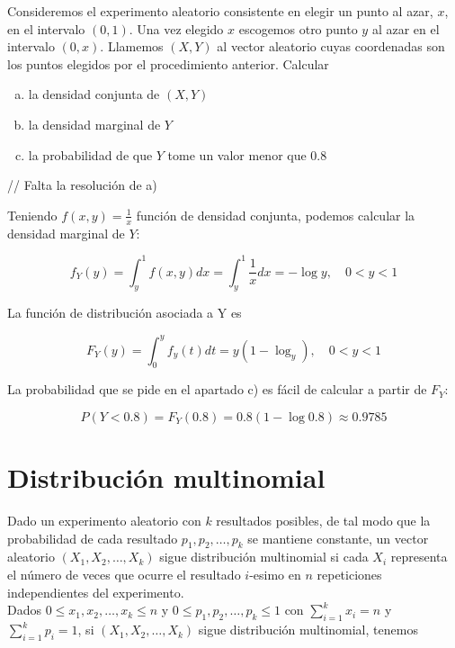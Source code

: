 \documentclass{article}
\begin{document}
\begin{theorem}
    
    Consideremos el experimento aleatorio consistente en elegir un punto al azar, $x$, en el intervalo $(0, 1)$. Una vez elegido $x$ escogemos
    otro punto $y$ al azar en el intervalo $(0, x)$. Llamemos $(X, Y)$ al vector aleatorio cuyas coordenadas son los puntos elegidos por el 
    procedimiento anterior. Calcular
    \begin{enumerate}[a)]
        \item la densidad conjunta de $(X, Y)$
        \item la densidad marginal de $Y$
        \item la probabilidad de que $Y$ tome un valor menor que $0.8$
    \end{enumerate}

    // Falta la resolución de a)

    Teniendo $f(x, y) = \frac{1}{x}$ función de densidad conjunta, podemos calcular la densidad marginal de $Y$:

    \[ f_{Y}(y) = \int_{y}^{1}f(x, y)dx = \int_{y}^{1}\frac{1}{x}dx = -\log{y}, \quad 0 < y < 1 \]

    La función de distribución asociada a Y es

    \[ F_{Y}(y) = \int_{0}^{y}f_{y}(t)dt = y(1 - \log_{y}), \quad 0 < y < 1 \]

    La probabilidad que se pide en el apartado c) es fácil de calcular a partir de $F_{Y}$:

    \[ P(Y < 0.8) = F_{Y}(0.8) = 0.8(1 - \log{0.8}) \approx 0.9785 \]

\end{theorem}

\newpage


\section{Distribución multinomial}


Dado un experimento aleatorio con $k$ resultados posibles, de tal modo que la probabilidad de cada resultado $p_1, p_2, \dots, p_k$ se mantiene constante,
un vector aleatorio $(X_1, X_2, \dots, X_k)$ sigue distribución multinomial si cada $X_{i}$ representa el número de veces que ocurre el resultado $i$-esimo
en $n$ repeticiones independientes del experimento. \\
Dados $0 \leq x_1, x_2, \dots, x_k \leq n$ y $0 \leq p_1, p_2, \dots, p_k \leq 1$ con $\sum_{i = 1}^{k}x_i = n$ y $\sum_{i = 1}^{k}p_i = 1$, si 
$(X_1, X_2, \dots, X_k)$ sigue distribución multinomial, tenemos
\end{document}
